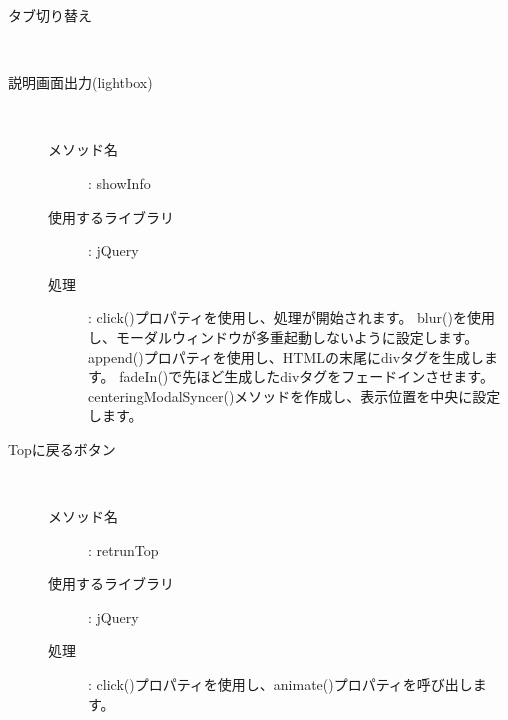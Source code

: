 \documentclass[a4j,titlepage]{jarticle}
\begin{document}
\begin{description}
\item[タブ切り替え]~\\

\clearpage

\item[説明画面出力(lightbox)]~
  \begin{description}
    \item [メソッド名] : showInfo
    \item [使用するライブラリ] : jQuery
    \item [処理] : click()プロパティを使用し、処理が開始されます。
    blur()を使用し、モーダルウィンドウが多重起動しないように設定します。
    append()プロパティを使用し、HTMLの末尾にdivタグを生成します。
    fadeIn()で先ほど生成したdivタグをフェードインさせます。
    centeringModalSyncer()メソッドを作成し、表示位置を中央に設定します。
  \end{description}

\item[Topに戻るボタン]~
  \begin{description}
    \item [メソッド名] : retrunTop
    \item [使用するライブラリ] : jQuery
    \item [処理] : click()プロパティを使用し、animate()プロパティを呼び出します。
  \end{description}



\end{description}
\end{document}
